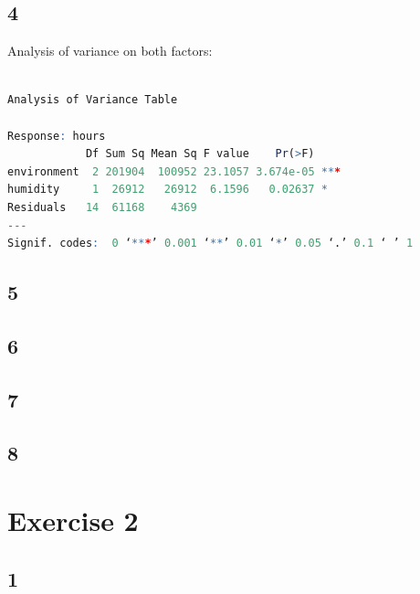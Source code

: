 \documentclass{article}
\begin{document}
    \subsection*{4}
      Analysis of variance on both factors:\\\\
      \begin{lstlisting}[language=R]
Analysis of Variance Table

Response: hours
            Df Sum Sq Mean Sq F value    Pr(>F)    
environment  2 201904  100952 23.1057 3.674e-05 ***
humidity     1  26912   26912  6.1596   0.02637 *  
Residuals   14  61168    4369                      
---
Signif. codes:  0 ‘***’ 0.001 ‘**’ 0.01 ‘*’ 0.05 ‘.’ 0.1 ‘ ’ 1
      \end{lstlisting}
    
    \subsection*{5}
    
    \subsection*{6}
    
    \subsection*{7}
    
    \subsection*{8}
    
  \section*{Exercise 2}
    \subsection*{1}
     
\end{document}
